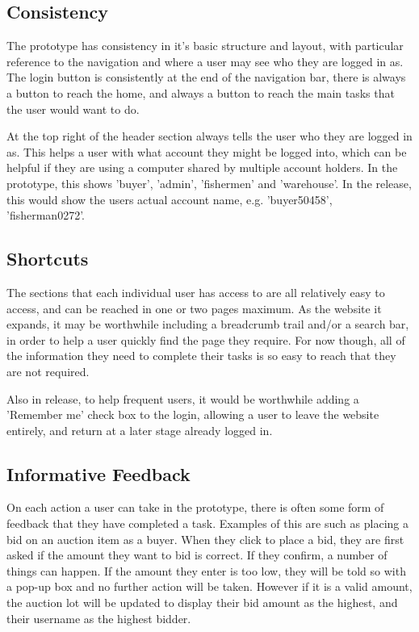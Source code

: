 \documentclass{article}
\begin{document}
\subsection{Consistency}
The prototype has consistency in it's basic structure and layout, with particular reference to the navigation and where a user may see who they are logged in as. The login button is consistently at the end of the navigation bar, there is always a button to reach the home, and always a button to reach the main tasks that the user would want to do.

At the top right of the header section always tells the user who they are logged in as. This helps a user with what account they might be logged into, which can be helpful if they are using a computer shared by multiple account holders. In the prototype, this shows 'buyer', 'admin', 'fishermen' and 'warehouse'. In the release, this would show the users actual account name, e.g. 'buyer50458', 'fisherman0272'.

\subsection{Shortcuts}
The sections that each individual user has access to are all relatively easy to access, and can be reached in one or two pages maximum. As the website it expands, it may be worthwhile including a breadcrumb trail and/or a search bar, in order to help a user quickly find the page they require. For now though, all of the information they need to complete their tasks is so easy to reach that they are not required.

Also in release, to help frequent users, it would be worthwhile adding a 'Remember me' check box to the login, allowing a user to leave the website entirely, and return at a later stage already logged in.

\subsection{Informative Feedback}
On each action a user can take in the prototype, there is often some form of feedback that they have completed a task. Examples of this are such as placing a bid on an auction item as a buyer. When they click to place a bid, they are first asked if the amount they want to bid is correct. If they confirm, a number of things can happen. If the amount they enter is too low, they will be told so with a pop-up box and no further action will be taken. However if it is a valid amount, the auction lot will be updated to display their bid amount as the highest, and their username as the highest bidder.
\end{document}
